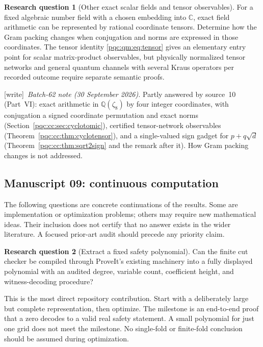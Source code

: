 \documentclass[11pt,letterpaper]{article}
\numberwithin{equation}{section}
\theoremstyle{definition}
\newtheorem{question}{Research question}
\theoremstyle{remark}
\newcommand{\Q}{\mathbb Q}
\newcommand{\C}{\mathbb C}
\newcommand{\wtag}{\textup{[write]}}
\begin{document}
\begin{question}[Other exact scalar fields and tensor observables]\label{pqc:q:fields}
For a fixed algebraic number field with a chosen embedding into $\C$, exact field arithmetic can be represented by rational coordinate tensors. Determine how the Gram packing changes when conjugation and norms are expressed in those coordinates. The tensor identity \eqref{pqc:qm:eq:tensor} gives an elementary entry point for scalar matrix-product observables, but physically normalized tensor networks and general quantum channels with several Kraus operators per recorded outcome require separate semantic proofs.
\par\noindent\wtag\ \emph{Batch-62 note (30 September 2026).} Partly answered by source~10 (Part~VI): exact arithmetic in
$\Q(\zeta_8)$ by four integer coordinates, with conjugation a signed coordinate
permutation and exact norms (Section~\ref{pqc:cc:sec:cyclotomic}), certified
tensor-network observables (Theorem~\ref{pqc:cc:thm:cyclotensor}), and a
single-valued sign gadget for $p+q\sqrt d$ (Theorem~\ref{pqc:cc:thm:sqrt2sign}
and the remark after it). How Gram packing changes is not addressed.
\end{question}



\subsection{Manuscript 09: continuous computation}
\label{pqc:conv:q09}\label{pqc:cb:sec:questions}
The following questions are concrete continuations of the results.  Some are
implementation or optimization problems; others may require new mathematical
ideas.  Their inclusion does not certify that no answer exists in the wider
literature.  A focused prior-art audit should precede any priority claim.

\begin{question}[Extract a fixed safety polynomial]\label{pqc:cb:q:extract}
Can the finite cut checker be compiled through ProveIt's existing machinery
into a fully displayed polynomial with an audited degree, variable count,
coefficient height, and witness-decoding procedure?
\end{question}
This is the most direct repository contribution.  Start with a deliberately
large but complete representation, then optimize.  The milestone is an
end-to-end proof that a zero decodes to a valid real safety statement.  A small
polynomial for just one grid does not meet the milestone.  No single-fold or
finite-fold conclusion should be assumed during optimization.
\end{document}
